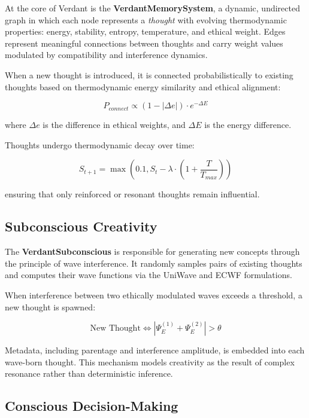 \documentclass{article}
\begin{document}
At the core of Verdant is the \textbf{VerdantMemorySystem}, a dynamic, undirected graph in which each node represents a \textit{thought} with evolving thermodynamic properties: energy, stability, entropy, temperature, and ethical weight. Edges represent meaningful connections between thoughts and carry weight values modulated by compatibility and interference dynamics.

When a new thought is introduced, it is connected probabilistically to existing thoughts based on thermodynamic energy similarity and ethical alignment:

\begin{equation}
P_{connect} \propto (1 - |\Delta e|) \cdot e^{-\Delta E}
\end{equation}

\noindent where $\Delta e$ is the difference in ethical weights, and $\Delta E$ is the energy difference.

Thoughts undergo thermodynamic decay over time:

\begin{equation}
S_{t+1} = \max\left(0.1, S_t - \lambda \cdot \left(1 + \frac{T}{T_{max}}\right)\right)
\end{equation}

\noindent ensuring that only reinforced or resonant thoughts remain influential.

\subsection{Subconscious Creativity}

The \textbf{VerdantSubconscious} is responsible for generating new concepts through the principle of wave interference. It randomly samples pairs of existing thoughts and computes their wave functions via the UniWave and ECWF formulations.

When interference between two ethically modulated waves exceeds a threshold, a new thought is spawned:

\begin{equation}
\text{New Thought} \iff |\Psi_E^{(1)} + \Psi_E^{(2)}| > \theta
\end{equation}

Metadata, including parentage and interference amplitude, is embedded into each wave-born thought. This mechanism models creativity as the result of complex resonance rather than deterministic inference.

\subsection{Conscious Decision-Making}
\end{document}
